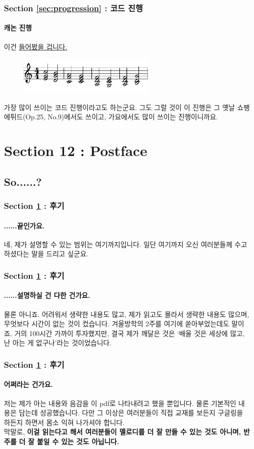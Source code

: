 \documentclass{beamer}
\begin{document}
	\begin{frame}
		\frametitle{Section \ref{sec:progression} : 코드 진행}
		\framesubtitle{캐논 진행}
		이건  {\color{cyan}\href{run:res/mp3/11/progression/canon_progression.mp3}{들어봤을 겁니다.}} 
		\begin{figure}
			\centering
			\includegraphics[width=0.6\textwidth]{res/pdf/11/progression/canon_progression.pdf}
		\end{figure}
		가장 많이 쓰이는 코드 진행이라고도 하는군요. 그도 그럴 것이 이 진행은 그 옛날 쇼팽 에튀드(Op.25, No.9)에서도 쓰이고, 가요에서도 많이 쓰이는 진행이니까요.
	\end{frame}
	
	\section{Section 12 : Postface}\label{sec:postface}
	\subsection{So......?}
	\begin{frame}
		\frametitle{Section \ref{sec:postface} : 후기}
		\framesubtitle{......끝인가요.}
		네, 제가 설명할 수 있는 범위는 여기까지입니다. 일단 여기까지 오신 여러분들께 수고하셨다는 말을 드리고 싶군요.
	\end{frame}
	
	\begin{frame}
		\frametitle{Section \ref{sec:postface} : 후기}
		\framesubtitle{......설명하실 건 다한 건가요.}
		물론 아니죠. 어려워서 생략한 내용도 많고, 제가 읽고도 몰라서 생략한 내용도 많으며, 무엇보다 시간이 없는 것이 컸습니다. 겨울방학의 2주를 여기에 쏟아부었는데도 말이죠. 거의 100시간 가까이 투자했지만, 결국 제가 깨달은 것은 `배울 것은 세상에 많고, 난 아는 게 없구나'라는 것이었습니다.
	\end{frame}
	
	\begin{frame}
		\frametitle{Section \ref{sec:postface} : 후기}
		\framesubtitle{어쩌라는 건가요.}
		저는 제가 아는 내용와 음감을 이 pdf로 나타내려고 했을 뿐입니다. 물론 기본적인 내용은 담는데 성공했습니다. 다만 그 이상은 여러분들이 직접 교재를 보든지 구글링을 하든지 하면서 몸소 익혀 나가셔야 합니다.\\
		막말로, {\bf 이걸 읽는다고 해서 여러분들이 멜로디를 더 잘 만들 수 있는 것도 아니며, 반주를 더 잘 붙일 수 있는 것도 아닙니다.}
	\end{frame}
	
\end{document}
